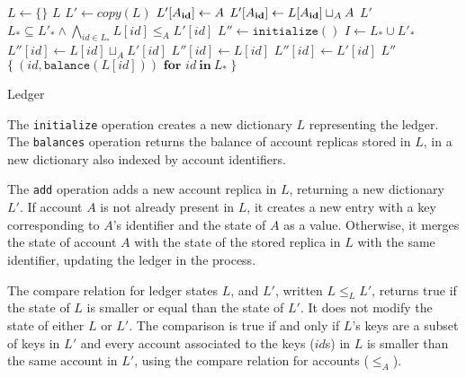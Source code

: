 \documentclass[9pt]{article}   	%
\begin{document}
\begin{algorithm}
\begin{algorithmic}[1]
    	\State $L \leftarrow \{ \}$ 
    	\State \Return $L$
    \EndFunction
    \State
        \State $L' \leftarrow \textit{copy}(L)$ 
		\State $L'[A_{\scriptsize\textbf{id}}] \leftarrow A$
	\Else
		\State $L'[A_{\scriptsize\textbf{id}}] \leftarrow L[A_{\scriptsize\textbf{id}}] \sqcup_A A$ 
	\EndIf
	\State \Return $L'$
    \EndFunction
    \State
    	\State \Return $L_* \subseteq L'_* \wedge \bigwedge_{id \in L_*} L[id] \leq_A L'[id]$ 
    \EndFunction
    \State
        \State $L'' \leftarrow \texttt{initialize}()$
        \State $I \leftarrow L_* \cup L'_*$
			\State $L''[id] \leftarrow  L[id] \sqcup_A L'[id]$  
			\State $L''[id] \leftarrow L[id]$
		\Else
			\State $L''[id] \leftarrow L'[id]$	
		\EndIf
	\EndFor
	\State \Return $L''$	
    \EndFunction
    \State
        \State \Return $\{~ (\textit{id}, \texttt{balance}(L[id])) \textbf{~for~} id ~\textbf{in}~ L_* ~\}$  
    \EndFunction
\end{algorithmic}
\caption{\label{alg:ledger} Ledger}
\end{algorithm}

The \texttt{initialize} operation creates a new dictionary $L$ representing the ledger. The \texttt{balances} operation returns the balance of account replicas stored in $L$, in a new dictionary also indexed by account identifiers. 

The \texttt{add} operation adds a new account replica in $L$, returning a new dictionary $L'$. If account $A$ is not already present in $L$, it creates a new entry with a key corresponding to $A$'s identifier and the state of $A$ as a value. Otherwise, it merges the state of account $A$ with the state of the stored replica in $L$ with the same identifier, updating the ledger in the process.

The compare relation for ledger states $L$, and $L'$, written $L \leq_L L'$, returns true if the state of $L$ is smaller or equal than the state of $L'$. It does not modify the state of either $L$ or $L'$. The comparison is true if and only if $L$'s keys are a subset of keys in $L'$ and every account associated to the keys ($id$s) in $L$ is smaller than the same account in $L'$, using the compare relation for accounts ($\leq_A$).
\end{document}
